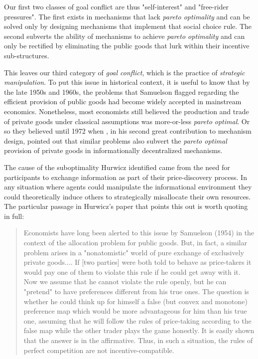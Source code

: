 Our first two classes of goal conflict are thus "self-interest" and "free-rider pressures". The first exists in mechanisms that lack \textit{pareto optimality} and can be solved only by designing mechanisms that implement that social choice rule. The second subverts the ability of mechanisms to achieve \textit{pareto optimality} and can only be rectified by eliminating the public goods that lurk within their incentive sub-structures.

This leaves our third category of \textit{goal conflict}, which is the practice of \textit{strategic manipulation}. To put this issue in historical context, it is useful to know that by the late 1950s and 1960s, the problems that Samuelson flagged regarding the efficient provision of public goods had become widely accepted in mainstream economics. Nonetheless, most economists still believed the production and trade of private goods under classical assumptions was more-or-less \textit{pareto optimal}. Or so they believed until 1972 when \citet{hurwicz1973design}, in his second great contribution to mechanism design, pointed out that similar problems also subvert the \textit{pareto optimal} provision of private goods in informationally decentralized mechanisms. 

The cause of the suboptimality Hurwicz identified came from the need for participants to exchange information as part of their price-discovery process. In any situation where agents could manipulate the informational environment they could theoretically induce others to strategically misallocate their own resources. The particular passage in Hurwicz's paper that points this out is worth quoting in full:

\begin{quote}
Economists have long been alerted to this issue by Samuelson (1954) in the context of the allocation problem for public goods. But, in fact, a similar problem arises in a "nonatomistic" world of pure exchange of exclusively private goods.... If [two parties] were both told to behave as price-takers it would pay one of them to violate this rule if he could get away with it. Now we assume that he cannot violate the rule openly, but he can "pretend" to have preferences different from his true ones. The question is whether he could think up for himself a false (but convex and monotone) preference map which would be more advantageous for him than his true one, assuming that he will follow the rules of price-taking according to the false map while the other trader plays the game honestly. It is easily shown that the answer is in the affirmative. Thus, in such a situation, the rules of perfect competition are not incentive-compatible.
\end{quote}

